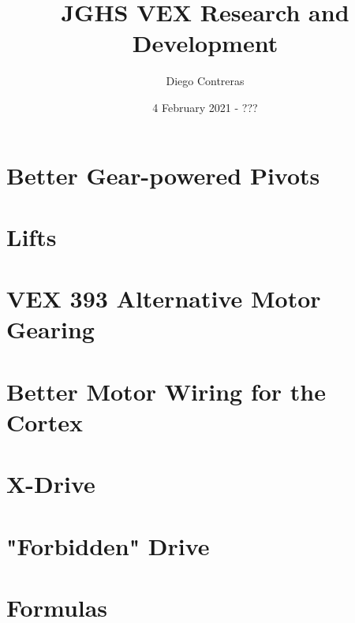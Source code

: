 \documentclass[12pt]{article}
\title{JGHS VEX Research and Development}
\author{Diego Contreras}
\date{4 February 2021 - ???}
\begin{document}
\maketitle
\newpage
\tableofcontents















\section{Better Gear-powered Pivots}
\section{Lifts}
\section{VEX 393 Alternative Motor Gearing}
\section{Better Motor Wiring for the Cortex}
\section{X-Drive}
\section{"Forbidden" Drive}
\section{Formulas}



\end{document}
